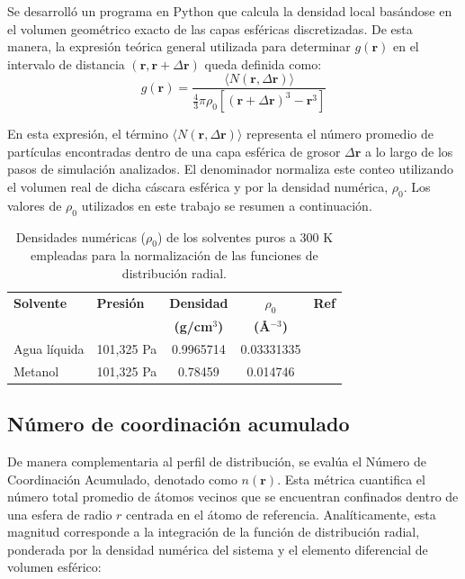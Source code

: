 Se desarrolló un programa en Python que calcula la densidad local basándose en el volumen geométrico exacto de las capas esféricas discretizadas. De esta manera, la expresión teórica general utilizada para determinar $g(\mathbf{r})$ en el intervalo de distancia $(\mathbf{r}, \mathbf{r} + \Delta \mathbf{r})$ queda definida como:
\begin{equation}
    g(\mathbf{r}) = \frac{\langle N(\mathbf{r}, \Delta \mathbf{r}) \rangle}{\frac{4}{3}\pi \rho_{0} \left[ (\mathbf{r} + \Delta \mathbf{r})^3 - \mathbf{r}^3 \right]}
    \label{eq:rdf_general}
\end{equation}

En esta expresión, el término $\langle N(\mathbf{r}, \Delta \mathbf{r}) \rangle$ representa el número promedio de partículas encontradas dentro de una capa esférica de grosor $\Delta \mathbf{r}$ a lo largo de los pasos de simulación analizados. El denominador normaliza este conteo utilizando el volumen real de dicha cáscara esférica y por la densidad numérica, $\rho_{0}$. Los valores de $\rho_{0}$ utilizados en este trabajo se resumen a continuación. 

\begin{table}[htbp]
    \centering
    \caption{Densidades numéricas ($\rho_0$) de los solventes puros a 300 K empleadas para la normalización de las funciones de distribución radial.}
    \label{tab:densidades_solventes}
    \begin{tabular}{llccc}
        \hline
        \textbf{Solvente} & \textbf{Presión} & \textbf{Densidad} & \textbf{$\rho_0$} & \textbf{Ref} \\
        & & \textbf{(g/cm$^3$)} & \textbf{(\AA$^{-3}$)} & \\ \hline
        Agua líquida & 101,325 Pa     & 0.9965714 & 0.03331335 & \cite{rumble2017crc, marsh1987recommended} \\
        Metanol & 101,325 Pa & 0.78459  & 0.014746 & \cite{NIST_WebBook_Fluids} \\ \hline
    \end{tabular}
\end{table}

\subsection{Número de coordinación acumulado}

De manera complementaria al perfil de distribución, se evalúa el Número de Coordinación Acumulado, denotado como $n(\mathbf{r})$. Esta métrica cuantifica el número total promedio de átomos vecinos que se encuentran confinados dentro de una esfera de radio $r$ centrada en el átomo de referencia. Analíticamente, esta magnitud corresponde a la integración de la función de distribución radial, ponderada por la densidad numérica del sistema y el elemento diferencial de volumen esférico:


